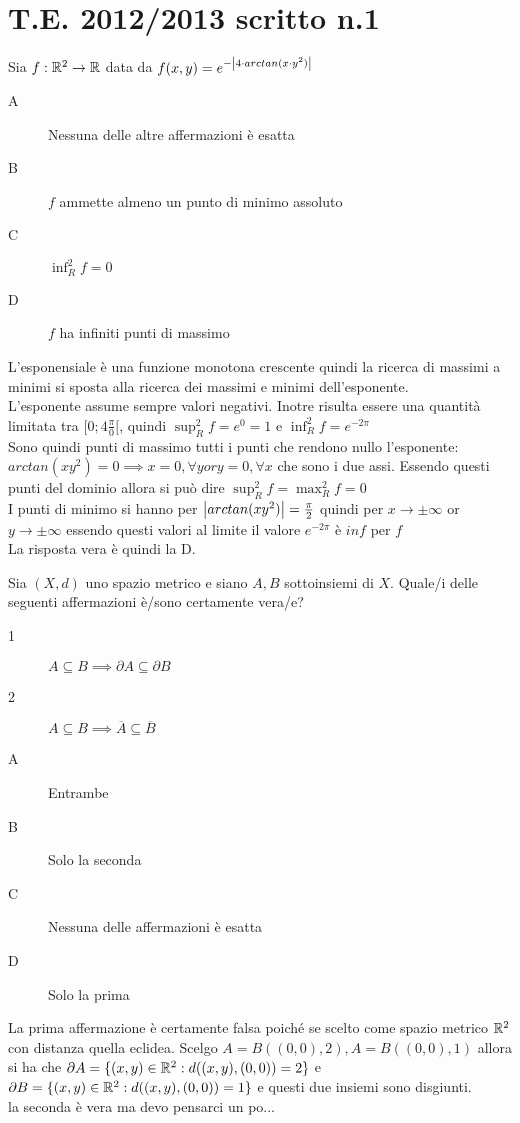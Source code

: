 \section{T.E. 2012/2013 scritto n.1}
\begin{exercise}
	Sia $f: \mathbb{R}^2 \to \mathbb{R}$ data da $f(x, y)=e^{-\left|4\cdot arctan(x\cdot y^2)\right|}$
	\begin{description}
		\item[A] Nessuna delle altre affermazioni è esatta
		\item[B] $f$ ammette almeno un punto di minimo assoluto
		\item[C] $\inf_R^2f = 0$
		\item[D] $f$ ha infiniti punti di massimo
	\end{description}
	L'esponensiale è una funzione monotona crescente quindi la ricerca di massimi a minimi si sposta alla ricerca dei massimi e minimi dell'esponente.\\
	L'esponente assume sempre valori negativi. Inotre risulta essere una quantità limitata tra $[0;4\frac{\pi}{0}[$, quindi $\sup_R^2f=e^0=1$ e $\inf_R^2f=e^{-2\pi}$\\
	Sono quindi punti di massimo tutti i punti che rendono nullo l'esponente: $arctan(xy^2)=0 \implies x=0,\forall y or y=0,\forall x$ che sono i due assi. Essendo questi punti del dominio allora si può dire $\sup_R^2f=\max_R^2f=0$\\
	I punti di minimo si hanno per $\left|arctan(xy^2)\right|=\frac{\pi}{2}$ quindi per $x \to \pm\infty$ or $y \to \pm\infty$ essendo questi valori al limite il valore $e^{-2\pi}$ è $inf$ per $f$\\
	La risposta vera è quindi la D.\\
\end{exercise}
\begin{exercise}
	Sia $(X,d)$ uno spazio metrico e siano $A, B$ sottoinsiemi di $X$. Quale/i delle seguenti affermazioni è/sono certamente vera/e?
	\begin{description}
		\item[1] $A\subseteq B \implies\partial A\subseteq \partial B$
		\item[2] $A\subseteq B \implies\overline{A}\subseteq\overline{B}$
	\end{description}
	\begin{description}
		\item[A] Entrambe
		\item[B] Solo la seconda
		\item[C] Nessuna delle affermazioni è esatta
		\item[D] Solo la prima
	\end{description}
	La prima affermazione è certamente falsa poiché se scelto come spazio metrico $\mathbb{R}^2$ con distanza quella eclidea. Scelgo $A=B((0,0),2), A=B((0,0),1)$ allora si ha che $\partial A = \{(x,y)\in \mathbb{R}^2:d((x,y),(0,0))=2\}$ e $\partial B = \{(x,y)\in \mathbb{R}^2:d((x,y),(0,0))=1\}$ e questi due insiemi sono disgiunti.\\
	la seconda è vera ma devo pensarci un po...\\
\end{exercise}


\endgroup %

